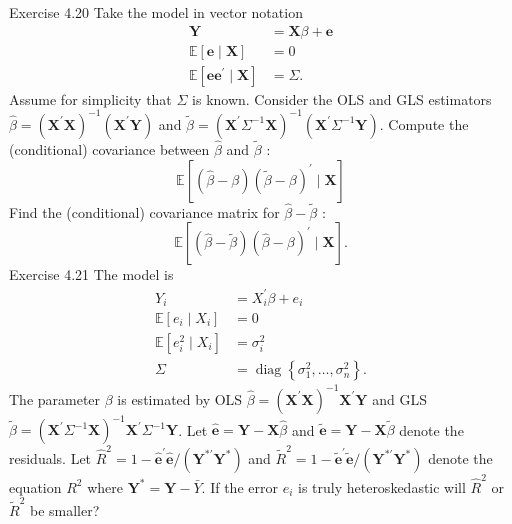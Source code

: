 \documentclass[10pt]{article}
\begin{document}
Exercise 4.20 Take the model in vector notation
$$
\begin{aligned}
\boldsymbol{Y} &=\boldsymbol{X} \beta+\boldsymbol{e} \\
\mathbb{E}[\boldsymbol{e} \mid \boldsymbol{X}] &=0 \\
\mathbb{E}\left[\boldsymbol{e} \boldsymbol{e}^{\prime} \mid \boldsymbol{X}\right] &=\Sigma .
\end{aligned}
$$
Assume for simplicity that $\Sigma$ is known. Consider the OLS and GLS estimators $\widehat{\beta}=\left(\boldsymbol{X}^{\prime} \boldsymbol{X}\right)^{-1}\left(\boldsymbol{X}^{\prime} \boldsymbol{Y}\right)$ and $\widetilde{\beta}=\left(\boldsymbol{X}^{\prime} \Sigma^{-1} \boldsymbol{X}\right)^{-1}\left(\boldsymbol{X}^{\prime} \Sigma^{-1} \boldsymbol{Y}\right)$. Compute the (conditional) covariance between $\widehat{\beta}$ and $\widetilde{\beta}$ :
$$
\mathbb{E}\left[(\widehat{\beta}-\beta)(\widetilde{\beta}-\beta)^{\prime} \mid \boldsymbol{X}\right]
$$
Find the (conditional) covariance matrix for $\widehat{\beta}-\widetilde{\beta}$ :
$$
\mathbb{E}\left[(\widehat{\beta}-\widetilde{\beta})(\widehat{\beta}-\beta)^{\prime} \mid \boldsymbol{X}\right] .
$$
Exercise 4.21 The model is
$$
\begin{aligned}
Y_{i} &=X_{i}^{\prime} \beta+e_{i} \\
\mathbb{E}\left[e_{i} \mid X_{i}\right] &=0 \\
\mathbb{E}\left[e_{i}^{2} \mid X_{i}\right] &=\sigma_{i}^{2} \\
\Sigma &=\operatorname{diag}\left\{\sigma_{1}^{2}, \ldots, \sigma_{n}^{2}\right\} .
\end{aligned}
$$
The parameter $\beta$ is estimated by OLS $\widehat{\beta}=\left(\boldsymbol{X}^{\prime} \boldsymbol{X}\right)^{-1} \boldsymbol{X}^{\prime} \boldsymbol{Y}$ and GLS $\widetilde{\beta}=\left(\boldsymbol{X}^{\prime} \Sigma^{-1} \boldsymbol{X}\right)^{-1} \boldsymbol{X}^{\prime} \Sigma^{-1} \boldsymbol{Y}$. Let $\widehat{\boldsymbol{e}}=\boldsymbol{Y}-\boldsymbol{X} \widehat{\beta}$ and $\widetilde{\boldsymbol{e}}=\boldsymbol{Y}-\boldsymbol{X} \widetilde{\beta}$ denote the residuals. Let $\widehat{R}^{2}=1-\widehat{\boldsymbol{e}}^{\prime} \widehat{\boldsymbol{e}} /\left(\boldsymbol{Y}^{* \prime} \boldsymbol{Y}^{*}\right)$ and $\widetilde{R}^{2}=1-\widetilde{\boldsymbol{e}}^{\prime} \widetilde{\boldsymbol{e}} /\left(\boldsymbol{Y}^{* \prime} \boldsymbol{Y}^{*}\right)$ denote the equation $R^{2}$ where $\boldsymbol{Y}^{*}=\boldsymbol{Y}-\bar{Y}$. If the error $e_{i}$ is truly heteroskedastic will $\widehat{R}^{2}$ or $\widetilde{R}^{2}$ be smaller?
\end{document}
